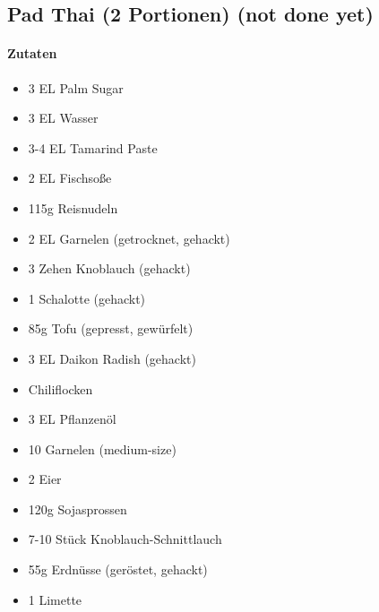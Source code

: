 \newpage
\subsection{Pad Thai (2 Portionen) (not done yet)}
\paragraph{Zutaten}
\begin{itemize}[noitemsep]
	\item 3 EL Palm Sugar
	\item 3 EL Wasser
	\item 3-4 EL Tamarind Paste
	\item 2 EL Fischsoße
	\vspace{0.5cm}
	\item 115g Reisnudeln
	\item 2 EL Garnelen (getrocknet, gehackt)
	\item 3 Zehen Knoblauch (gehackt)
	\item 1 Schalotte (gehackt)
	\item 85g Tofu (gepresst, gewürfelt)
	\item 3 EL Daikon Radish (gehackt)
	\item Chiliflocken
	\item 3 EL Pflanzenöl
	\item 10 Garnelen (medium-size)
	\item 2 Eier
	\item 120g Sojasprossen
	\item 7-10 Stück Knoblauch-Schnittlauch 
	\item 55g Erdnüsse (geröstet, gehackt)
	\item 1 Limette
\end{itemize}

